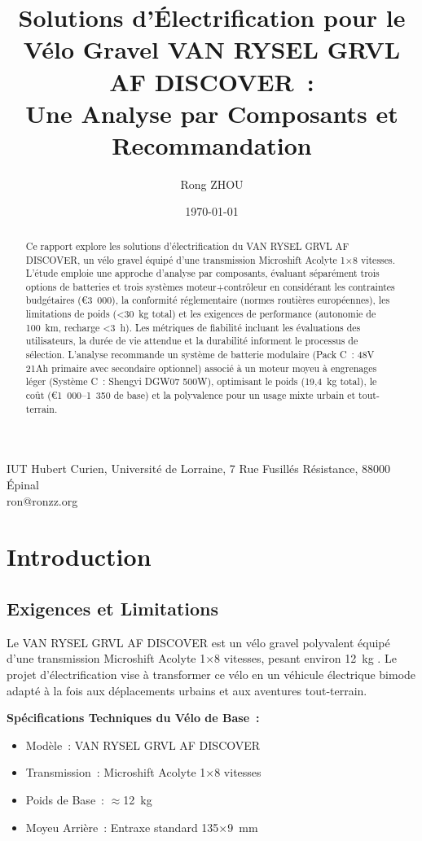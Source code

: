 \documentclass[12pt,a4paper]{article}
\title{Solutions d'Électrification pour le Vélo Gravel VAN RYSEL GRVL AF DISCOVER~:\\
Une Analyse par Composants et Recommandation}
\author{Rong ZHOU}
\date{\today}
\makeatletter
\newcommand{\univaddress}{IUT Hubert Curien, Université de Lorraine, 7 Rue Fusillés Résistance, 88000 Épinal}
\newcommand{\contact}{ron@ronzz.org}
\makeatother
\begin{document}
\maketitle
\begin{center}
\univaddress\\
\contact
\end{center}

\begin{abstract}
Ce rapport explore les solutions d'électrification du VAN RYSEL GRVL AF DISCOVER, un vélo gravel équipé d'une transmission Microshift Acolyte 1×8 vitesses. L'étude emploie une approche d'analyse par composants, évaluant séparément trois options de batteries et trois systèmes moteur+contrôleur en considérant les contraintes budgétaires (€3~000), la conformité réglementaire (normes routières européennes), les limitations de poids (<30~kg total) et les exigences de performance (autonomie de 100~km, recharge <3~h). Les métriques de fiabilité incluant les évaluations des utilisateurs, la durée de vie attendue et la durabilité informent le processus de sélection. L'analyse recommande un système de batterie modulaire (Pack C~: 48V 21Ah primaire avec secondaire optionnel) associé à un moteur moyeu à engrenages léger (Système C~: Shengyi DGW07 500W), optimisant le poids (19,4~kg total), le coût (€1~000--1~350 de base) et la polyvalence pour un usage mixte urbain et tout-terrain.
\end{abstract}

\section{Introduction}

\subsection{Exigences et Limitations}

Le VAN RYSEL GRVL AF DISCOVER est un vélo gravel polyvalent équipé d'une transmission Microshift Acolyte 1×8 vitesses, pesant environ 12~kg \cite{decathlon-bike}. Le projet d'électrification vise à transformer ce vélo en un véhicule électrique bimode adapté à la fois aux déplacements urbains et aux aventures tout-terrain.

\textbf{Spécifications Techniques du Vélo de Base~:}
\begin{itemize}
    \item Modèle~: VAN RYSEL GRVL AF DISCOVER
    \item Transmission~: Microshift Acolyte 1×8 vitesses
    \item Poids de Base~: $\approx$12~kg
    \item Moyeu Arrière~: Entraxe standard 135×9~mm
\end{itemize}
\end{document}
